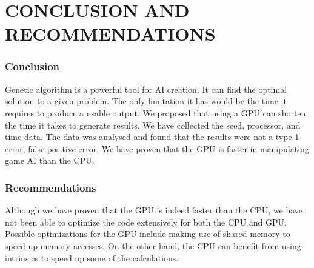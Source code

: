 \chapter{CONCLUSION AND RECOMMENDATIONS}

\subsection{Conclusion}
Genetic algorithm is a powerful tool for AI creation. It can find the optimal
solution to a given problem. The only limitation it has would be the time it 
requires to produce a usable output. We proposed that using a
GPU can shorten the time it takes to generate results. We have collected the
seed, processor, and time data. The data was analysed and found that the results
were not a type 1 error, false positive error. We have proven that the GPU is faster
in manipulating game AI than the CPU.

\subsection{Recommendations}
Although we have proven that the GPU is indeed faster than the CPU, we have not
been able to optimize the code extensively for both the CPU and GPU. Possible 
optimizations for the GPU include making use of shared memory to speed up memory
accesses. On the other hand, the CPU can benefit from using intrinsics to speed
up some of the calculations.

  